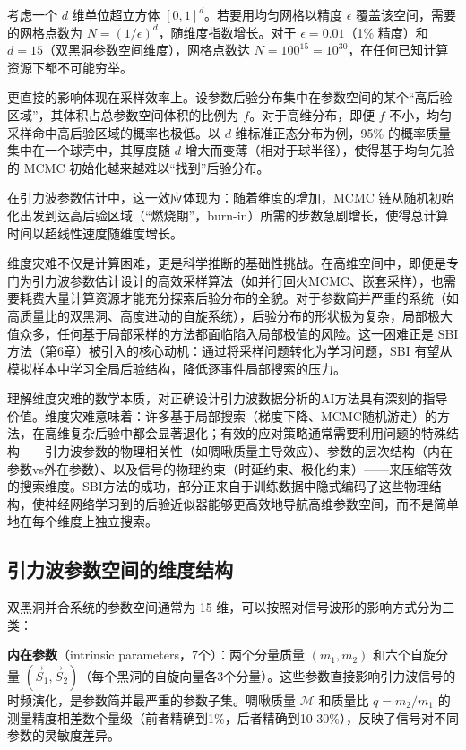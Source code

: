 考虑一个 $d$ 维单位超立方体 $[0,1]^d$。若要用均匀网格以精度 $\epsilon$ 覆盖该空间，需要的网格点数为 $N = (1/\epsilon)^d$，随维度指数增长。对于 $\epsilon = 0.01$（1\% 精度）和 $d = 15$（双黑洞参数空间维度），网格点数达 $N = 100^{15} = 10^{30}$，在任何已知计算资源下都不可能穷举。

更直接的影响体现在采样效率上。设参数后验分布集中在参数空间的某个“高后验区域”，其体积占总参数空间体积的比例为 $f$。对于高维分布，即便 $f$ 不小，均匀采样命中高后验区域的概率也极低。以 $d$ 维标准正态分布为例，95\% 的概率质量集中在一个球壳中，其厚度随 $d$ 增大而变薄（相对于球半径），使得基于均匀先验的 MCMC 初始化越来越难以“找到”后验分布。

在引力波参数估计中，这一效应体现为：随着维度的增加，MCMC 链从随机初始化出发到达高后验区域（“燃烧期”，burn-in）所需的步数急剧增长，使得总计算时间以超线性速度随维度增长。

维度灾难不仅是计算困难，更是科学推断的基础性挑战。在高维空间中，即便是专门为引力波参数估计设计的高效采样算法（如并行回火MCMC、嵌套采样），也需要耗费大量计算资源才能充分探索后验分布的全貌。对于参数简并严重的系统（如高质量比的双黑洞、高度进动的自旋系统），后验分布的形状极为复杂，局部极大值众多，任何基于局部采样的方法都面临陷入局部极值的风险。这一困难正是 SBI 方法（第6章）被引入的核心动机：通过将采样问题转化为学习问题，SBI 有望从模拟样本中学习全局后验结构，降低逐事件局部搜索的压力。

理解维度灾难的数学本质，对正确设计引力波数据分析的AI方法具有深刻的指导价值。维度灾难意味着：许多基于局部搜索（梯度下降、MCMC随机游走）的方法，在高维复杂后验中都会显著退化；有效的应对策略通常需要利用问题的特殊结构——引力波参数的物理相关性（如啁啾质量主导效应）、参数的层次结构（内在参数vs外在参数）、以及信号的物理约束（时延约束、极化约束）——来压缩等效的搜索维度。SBI方法的成功，部分正来自于训练数据中隐式编码了这些物理结构，使神经网络学习到的后验近似器能够更高效地导航高维参数空间，而不是简单地在每个维度上独立搜索。

\subsection{引力波参数空间的维度结构}

双黑洞并合系统的参数空间通常为 15 维，可以按照对信号波形的影响方式分为三类：

\textbf{内在参数}（intrinsic parameters，7个）：两个分量质量 $(m_1, m_2)$ 和六个自旋分量 $(\vec{S}_1, \vec{S}_2)$（每个黑洞的自旋向量各3个分量）。这些参数直接影响引力波信号的时频演化，是参数简并最严重的参数子集。啁啾质量 $\mathcal{M}$ 和质量比 $q = m_2/m_1$ 的测量精度相差数个量级（前者精确到1\%，后者精确到10-30\%），反映了信号对不同参数的灵敏度差异。

